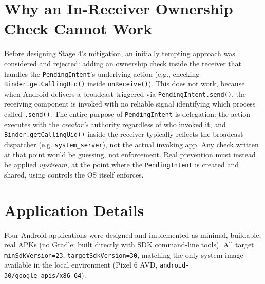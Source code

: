 \documentclass[11pt]{article}
\begin{document}
\section{Why an In-Receiver Ownership Check Cannot Work}

Before designing Stage 4's mitigation, an initially tempting approach was considered and
rejected: adding an ownership check inside the receiver that handles the
\texttt{PendingIntent}'s underlying action (e.g., checking
\texttt{Binder.getCallingUid()} inside \texttt{onReceive()}). This does not work,
because when Android delivers a broadcast triggered via \texttt{PendingIntent.send()},
the receiving component is invoked with no reliable signal identifying which process
called \texttt{.send()}. The entire purpose of \texttt{PendingIntent} is delegation: the
action executes with the \emph{creator's} authority regardless of who invoked it, and
\texttt{Binder.getCallingUid()} inside the receiver typically reflects the broadcast
dispatcher (e.g. \texttt{system\_server}), not the actual invoking app. Any check
written at that point would be guessing, not enforcement. Real prevention must instead
be applied \emph{upstream}, at the point where the \texttt{PendingIntent} is created and
shared, using controls the OS itself enforces.

\section{Application Details}

Four Android applications were designed and implemented as minimal, buildable, real
APKs (no Gradle; built directly with SDK command-line tools). All target
\texttt{minSdkVersion=23}, \texttt{targetSdkVersion=30}, matching the only system image
available in the local environment (Pixel 6 AVD, \texttt{android-30/google\_apis/x86\_64}).
\end{document}
